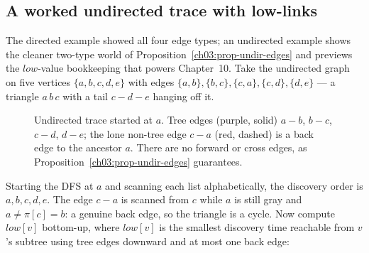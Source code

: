 \subsection{A worked undirected trace with low-links}
\label{ch03:undir-trace}

The directed example showed all four edge types; an undirected example shows the cleaner two-type world of Proposition~\ref{ch03:prop-undir-edges} and previews the $\mathit{low}$-value bookkeeping that powers Chapter~10. Take the undirected graph on five vertices $\{a,b,c,d,e\}$ with edges $\{a,b\},\{b,c\},\{c,a\},\{c,d\},\{d,e\}$ --- a triangle $a\,b\,c$ with a tail $c-d-e$ hanging off it.

\begin{figure}[H]
\centering
{}
\caption{Undirected trace started at $a$. Tree edges (purple, solid) $a-b$, $b-c$, $c-d$, $d-e$; the lone non-tree edge $c-a$ (red, dashed) is a back edge to the ancestor $a$. There are no forward or cross edges, as Proposition~\ref{ch03:prop-undir-edges} guarantees.}
\label{ch03:fig-undir}
\end{figure}

Starting the DFS at $a$ and scanning each list alphabetically, the discovery order is $a,b,c,d,e$. The edge $c-a$ is scanned from $c$ while $a$ is still gray and $a\ne\pi[c]=b$: a genuine back edge, so the triangle is a cycle. Now compute $\mathit{low}[v]$ bottom-up, where $\mathit{low}[v]$ is the smallest discovery time reachable from $v$'s subtree using tree edges downward and at most one back edge:

